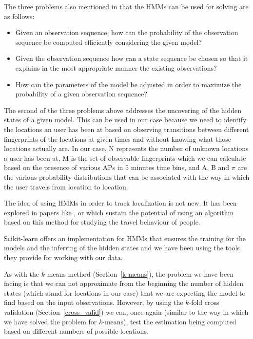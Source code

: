The three problems also mentioned in \cite{18626} that the HMMs can be used for
solving are as follows:
\begin{itemize}
  \item Given an observation sequence, how can the probability of the
  observation sequence be computed efficiently considering the given model?
  \item Given the observation sequence how can a state sequence be chosen so
  that it explains in the most appropriate manner the existing observations?
  \item How can the parameters of the model be adjusted in order to maximize the
  probability of a given observation sequence?
\end{itemize}

The second of the three problems above addresses the uncovering of the hidden
states of a given model. This can be used in our case because we need to
identify the locations an user has been at based on observing transitions
between different fingerprints of the locations at given times and without
knowing what those locations actually are. In our case, N represents the number
of unknown locations a user has been at, M is the set of observable fingerprints
which we can calculate based on the presence of various APs in $5$ minutes time
bins, and A, B and $\pi$ are the various probability distributions that can be
associated with the way in which the user travels from location to location.

The idea of using HMMs in order to track localization is not new. It has been
explored in papers like \cite{el2013indoor}, \cite{inatomi2013hidden} or
\cite{morelli2007hidden} which sustain the potential of using an algorithm based
on this method for studying the travel behaviour of people.

Scikit-learn \cite{SL} offers an implementation for HMMs that ensures the
training for the models and the inferring of the hidden states and we have been
using the tools they provide for working with our data.

As with the $k$-means method (Section~\ref{k-means}), the problem we have been
facing is that we can not approximate from the beginning the number of hidden
states (which stand for locations in our case) that we are expecting the model
to find based on the input observations. However, by using the $k$-fold cross
validation (Section~\ref{cross_valid}) we can, once again (similar to the way in
which we have solved the problem for $k$-means), test the estimation being
computed based on different numbers of possible locations.

